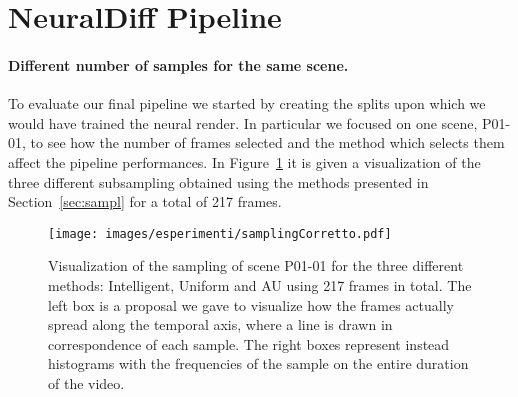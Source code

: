 \section{NeuralDiff Pipeline}
\paragraph{Different number of samples for the same scene.}
To evaluate our final pipeline we started by creating the splits upon which we would have trained the neural render.
In particular we focused on one scene, P01-01, to see how the number of frames selected and the method which 
selects them affect the pipeline performances.
In Figure~\ref{fig:samplFreq} it is given a visualization of the three different subsampling obtained using the methods presented
in Section~\ref{sec:sampl} for a total of 217 frames.

\begin{figure}[H]
    \centering
    \texttt{[image: images/esperimenti/samplingCorretto.pdf]} 
    \caption{Visualization of the sampling of scene P01-01 for the three different methods: Intelligent, Uniform and AU using 217 frames in total.
        The left box is a proposal we gave to visualize how the frames actually spread along the temporal axis, where a line is drawn in correspondence
        of each sample. The right boxes represent instead histograms with the frequencies of the sample on the entire duration of the video.}\label{fig:samplFreq}
\end{figure}



